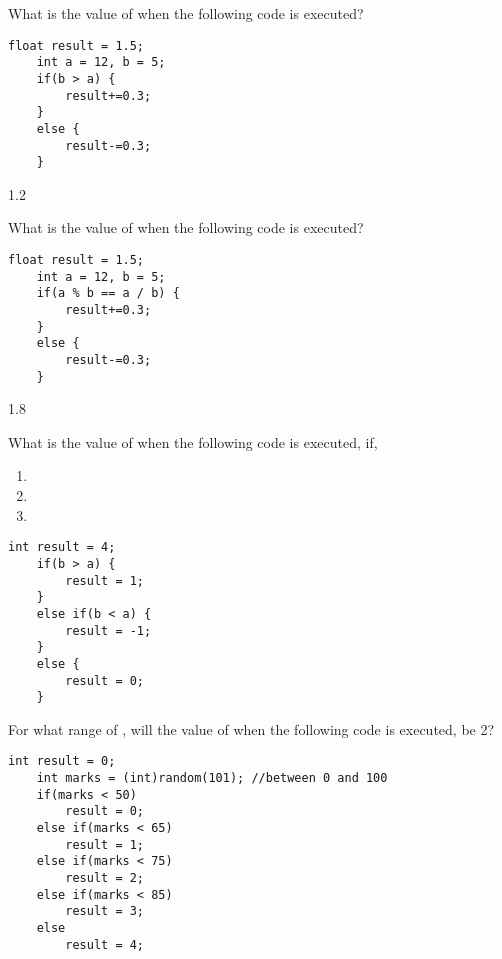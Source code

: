\begin{questions}
\question
What is the value of  when the following code is executed?

\begin{lstlisting}[basicstyle=\large]
	float result = 1.5;
	int a = 12, b = 5;
	if(b > a) {
		result+=0.3;
	}
	else {
		result-=0.3;
	}
\end{lstlisting}

\begin{solution}
1.2	
\end{solution}  \question
What is the value of  when the following code is executed?

\begin{lstlisting}[basicstyle=\large]
	float result = 1.5;
	int a = 12, b = 5;
	if(a % b == a / b) {
		result+=0.3;
	}
	else {
		result-=0.3;
	}
\end{lstlisting}

\begin{solution}
1.8
\end{solution}  \question
What is the value of  when the following code is executed, if,

\begin{enumerate}
\item {}
\item {}
\item {}
\end{enumerate}


\begin{lstlisting}[basicstyle=\large]
	int result = 4;
	if(b > a) {
		result = 1;
	}
	else if(b < a) {
		result = -1;
	}
	else {
		result = 0;
	}	
\end{lstlisting}

\begin{solution}
	\item {}
\item {}
\item {}

\end{solution}  \question
For what range of , will the value of  when the following code is executed, be 2?

\begin{lstlisting}[basicstyle=\large]
	int result = 0;
	int marks = (int)random(101); //between 0 and 100
	if(marks < 50)
		result = 0;
	else if(marks < 65)
		result = 1;
	else if(marks < 75)
		result = 2;
	else if(marks < 85)
		result = 3;
	else
		result = 4;
\end{lstlisting}


\end{questions}
